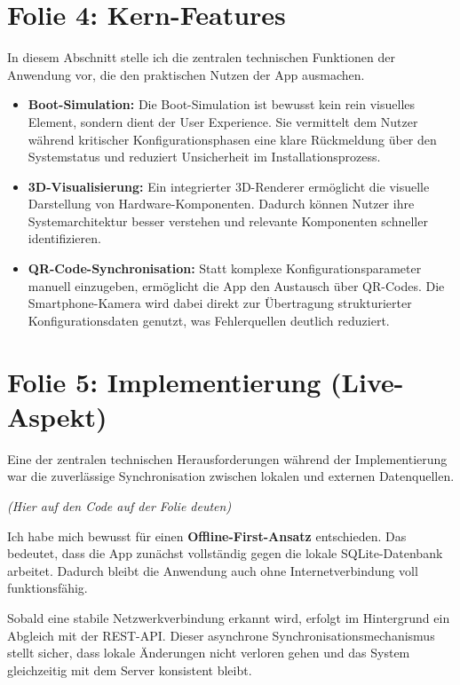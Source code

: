 \documentclass[12pt]{article}
\begin{document}
\section*{Folie 4: Kern-Features}
In diesem Abschnitt stelle ich die zentralen technischen Funktionen der Anwendung vor, die den praktischen Nutzen der App ausmachen.

\begin{itemize}
    \item \textbf{Boot-Simulation:} Die Boot-Simulation ist bewusst kein rein visuelles Element, sondern dient der User Experience. Sie vermittelt dem Nutzer während kritischer Konfigurationsphasen eine klare Rückmeldung über den Systemstatus und reduziert Unsicherheit im Installationsprozess.

    \item \textbf{3D-Visualisierung:} Ein integrierter 3D-Renderer ermöglicht die visuelle Darstellung von Hardware-Komponenten. Dadurch können Nutzer ihre Systemarchitektur besser verstehen und relevante Komponenten schneller identifizieren.

    \item \textbf{QR-Code-Synchronisation:} Statt komplexe Konfigurationsparameter manuell einzugeben, ermöglicht die App den Austausch über QR-Codes. Die Smartphone-Kamera wird dabei direkt zur Übertragung strukturierter Konfigurationsdaten genutzt, was Fehlerquellen deutlich reduziert.
\end{itemize}

\section*{Folie 5: Implementierung (Live-Aspekt)}
Eine der zentralen technischen Herausforderungen während der Implementierung war die zuverlässige Synchronisation zwischen lokalen und externen Datenquellen.

\textit{(Hier auf den Code auf der Folie deuten)}

Ich habe mich bewusst für einen \textbf{Offline-First-Ansatz} entschieden. Das bedeutet, dass die App zunächst vollständig gegen die lokale SQLite-Datenbank arbeitet. Dadurch bleibt die Anwendung auch ohne Internetverbindung voll funktionsfähig.

Sobald eine stabile Netzwerkverbindung erkannt wird, erfolgt im Hintergrund ein Abgleich mit der REST-API. Dieser asynchrone Synchronisationsmechanismus stellt sicher, dass lokale Änderungen nicht verloren gehen und das System gleichzeitig mit dem Server konsistent bleibt.
\end{document}
